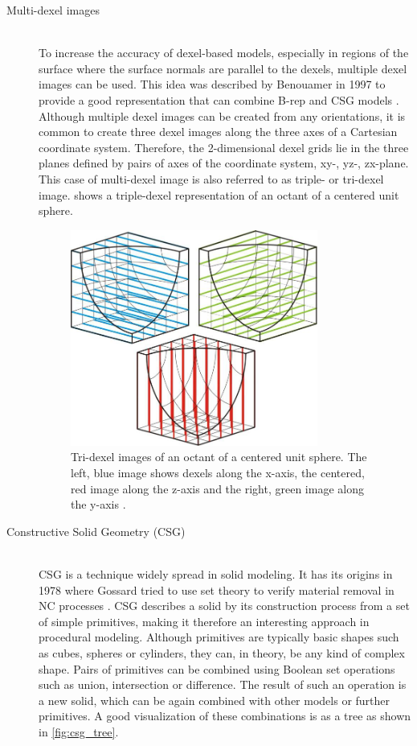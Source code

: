 \begin{description}
	\item[Multi-dexel images] \hfill \\
	To increase the accuracy of dexel-based models, especially in regions of the surface where the surface normals are parallel to the dexels, multiple dexel images can be used.
	This idea was described by Benouamer \etal in 1997 to provide a good representation that can combine B-rep and CSG models \cite{tridexel_intersection}.
	Although multiple dexel images can be created from any orientations, it is common to create three dexel images along the three axes of a Cartesian coordinate system.
	Therefore, the 2-dimensional dexel grids lie in the three planes defined by pairs of axes of the coordinate system, \ie xy-, yz-, zx-plane.
	This case of multi-dexel image is also referred to as triple- or tri-dexel image.
	 shows a triple-dexel representation of an octant of a centered unit sphere.

	\begin{figure}[H]
		\centering
		\includegraphics[width=0.8\textwidth]{images/tridexels}
		\caption[Tri-dexel image]{
			Tri-dexel images of an octant of a centered unit sphere.
			The left, blue image shows dexels along the x-axis, the centered, red image along the z-axis and the right, green image along the y-axis \cite{virtual_machining_review}.
		}
		\label{fig:tri_dexel_image}
	\end{figure}


	\item[Constructive Solid Geometry (CSG)] \hfill \\
	CSG is a technique widely spread in solid modeling.
	It has its origins in 1978 where Gossard \etal tried to use set theory to verify material removal in NC processes \cite{csg}.
	CSG describes a solid by its construction process from a set of simple primitives, making it therefore an interesting approach in procedural modeling.
	Although primitives are typically basic shapes such as cubes, spheres or cylinders, they can, in theory, be any kind of complex shape.
	Pairs of primitives can be combined using Boolean set operations such as union, intersection or difference.
	The result of such an operation is a new solid, which can be again combined with other models or further primitives.
	A good visualization of these combinations is as a tree as shown in \cref{fig:csg_tree}.


\end{description}
